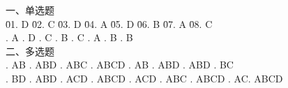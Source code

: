 \documentclass[a4paper]{book}
\begin{document}
\begin{tabbing}
一、单选题\\
\= 01. D \qquad \= 02. C \qquad \= 03. D \qquad \= 04. A \qquad \= 05. D \qquad \= 06. B \qquad \= 07. A \qquad \= 08. C \qquad \= \\
. A . D . C . B . C . A . B . B\\
二、多选题\\
. AB   . ABD  . ABC  . ABCD . AB   . ABD  . ABD  . BC\\
. BD   . ABD  . ACD  . ABCD . ACD  . ABC  . ABCD . AC. ABCD\\
\end{tabbing}
\end{document}
